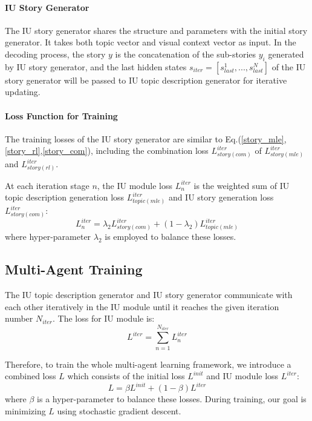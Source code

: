 \documentclass[11pt]{article}
\begin{document}
\paragraph{IU Story Generator}
The IU story generator shares the structure and parameters with the initial story generator. It takes both topic vector and visual context vector as input. In the decoding process, the story $y$ is the concatenation of the sub-stories $y_i$ generated by IU story generator, and the last hidden states $s_{iter}=[s^1_{last},...,s^N_{last}]$ of the IU story generator will be passed to IU topic description generator for iterative updating.


\paragraph{Loss Function for Training}

The training losses of the IU story generator are similar to Eq.(\ref{story_mle},\ref{story_rl},\ref{story_com}), including the combination loss $L^{iter}_{story(com)}$ of $L^{iter}_{story(mle)}$ and $L^{iter}_{story(rl)}$. 

At each iteration stage $n$, the IU module loss $L^{iter}_n$ is the weighted sum of IU topic description generation loss $L^{iter}_{topic(mle)}$ and IU story generation loss $L^{iter}_{story(com)}$:
{
\setlength\abovedisplayskip{3pt}
\setlength\belowdisplayskip{3pt}
\begin{equation}
L^{iter}_n = \lambda_2 L^{iter}_{story(com)}+(1-\lambda_2)L^{iter}_{topic(mle)}
\end{equation}
}where hyper-parameter $\lambda_2$ is employed to balance these losses.

\subsection{Multi-Agent Training}
The IU topic description generator and IU story generator communicate with each other iteratively in the IU module until it reaches the given iteration number $N_{iter}$. 
The loss for IU module is:
{
\setlength\abovedisplayskip{1pt}
\setlength\belowdisplayskip{1pt}
\begin{equation}
L^{iter} = \sum_{n=1}^{N_{iter}}L^{iter}_n
\end{equation}
}

Therefore, to train the whole multi-agent learning framework, we introduce a combined loss $L$ which consists of the initial loss $L^{init}$ and IU module loss $L^{iter}$:
{
\setlength\abovedisplayskip{1pt}
\setlength\belowdisplayskip{1pt}
\begin{equation}
L = \beta L^{init}+(1-\beta)L^{iter}
\end{equation}
}where $\beta$ is a hyper-parameter to balance these losses. During training, our goal is minimizing $L$ using stochastic gradient descent. 
\end{document}
